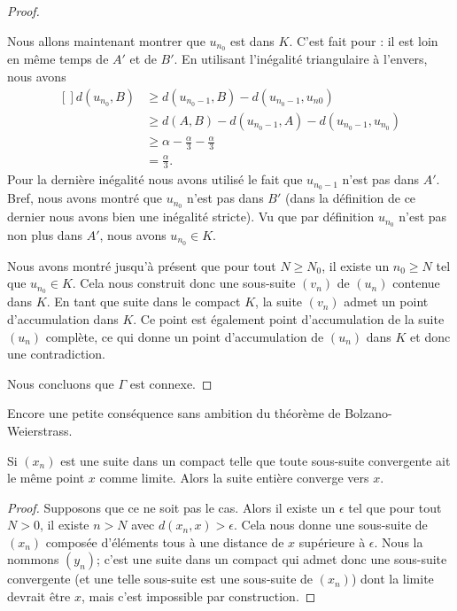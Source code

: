 \begin{proof}
\begin{subproof}
        Nous allons maintenant montrer que \( u_{n_0}\) est dans \( K\). C'est fait pour : il est loin en même temps de \( A'\) et de \( B'\). En utilisant l'inégalité triangulaire à l'envers, nous avons
        \begin{equation}
            \begin{aligned}[]
            d(u_{n_0},B)&\geq d(u_{n_0-1},B)-d(u_{n_0-1},u_{n0})\\
            &\geq d(A,B)-d(u_{n_0-1},A)-d(u_{n_0-1},u_{n_0})\\
            &\geq \alpha-\frac{ \alpha }{ 3 }-\frac{ \alpha }{ 3 }\\
            &=\frac{ \alpha }{ 3 }.
            \end{aligned}
        \end{equation}
        Pour la dernière inégalité nous avons utilisé le fait que \( u_{n_0-1}\) n'est pas dans \( A'\). Bref, nous avons montré que \( u_{n_0}\) n'est pas dans \( B'\) (dans la définition de ce dernier nous avons bien une inégalité stricte). Vu que par définition \( u_{n_0}\) n'est pas non plus dans \( A'\), nous avons \( u_{n_0}\in K\).

        Nous avons montré jusqu'à présent que pour tout \( N\geq N_0\), il existe un \( n_0\geq N\) tel que \( u_{n_0}\in K\). Cela nous construit donc une sous-suite \( (v_n)\) de \( (u_n)\) contenue dans \( K\). En tant que suite dans le compact \( K\), la suite \( (v_n)\) admet un point d'accumulation dans \( K\). Ce point est également point d'accumulation de la suite \( (u_n)\) complète, ce qui donne un point d'accumulation de \( (u_n)\) dans \( K\) et donc une contradiction.

    \end{subproof}
    Nous concluons que \( \Gamma\) est connexe.
\end{proof}

Encore une petite conséquence sans ambition du théorème de Bolzano-Weierstrass.
\begin{proposition}\label{PropHNylIAW}
    Si \( (x_n)\) est une suite dans un compact telle que toute sous-suite convergente ait le même point \( x\) comme limite. Alors la suite entière converge vers \( x\).
\end{proposition}

\begin{proof}
    Supposons que ce ne soit pas le cas. Alors il existe un \( \epsilon\) tel que pour tout \( N>0\), il existe \( n>N\) avec \( d(x_n,x)>\epsilon\). Cela nous donne une sous-suite de \( (x_n)\) composée d'éléments tous à une distance de \( x\) supérieure à \( \epsilon\). Nous la nommons \( (y_n)\); c'est une suite dans un compact qui admet donc une sous-suite convergente (et une telle sous-suite est une sous-suite de \( (x_n)\)) dont la limite devrait être \( x\), mais c'est impossible par construction.
\end{proof}

